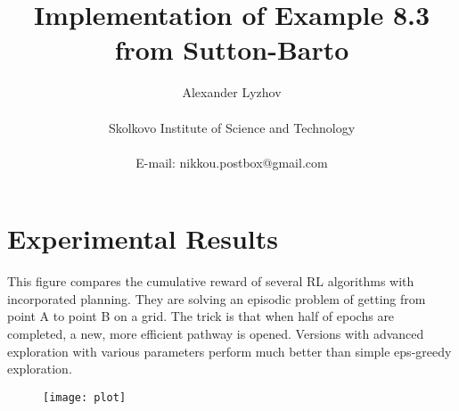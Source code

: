 \documentclass[12pt]{article}
\title{Implementation of Example 8.3 from Sutton-Barto}
\author
{Alexander Lyzhov\\
\\
\normalsize{Skolkovo Institute of Science and Technology}\\
\\
\normalsize{E-mail:  nikkou.postbox@gmail.com}
}
\date{}
\begin{document}
 

\maketitle 

\newpage

\section{Experimental Results}

This figure compares the cumulative reward of several RL algorithms with incorporated planning.
They are solving an episodic problem of getting from point A to point B on a grid.
The trick is that when half of epochs are completed, a new, more efficient pathway is opened.
Versions with advanced exploration with various parameters perform much better than simple eps-greedy exploration.

\begin{figure}[ht]
    \centering
    \texttt{[image: plot]}
\end{figure}
\end{document}

